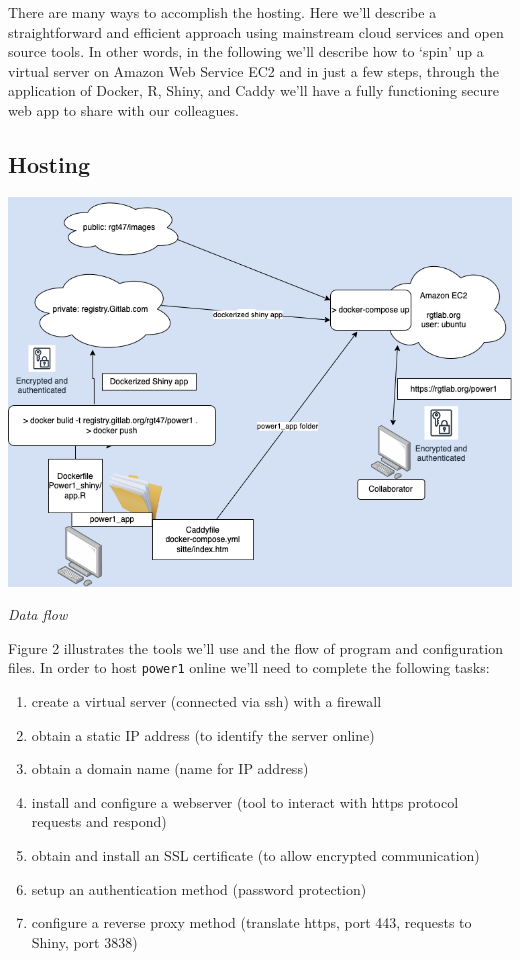 \documentclass[
  letterpaper,
  DIV=11,
  numbers=noendperiod,
  oneside]{scrartcl}
\providecommand{\tightlist}{%
  \setlength{\itemsep}{0pt}\setlength{\parskip}{0pt}}\usepackage{longtable,booktabs,array}
\begin{document}
There are many ways to accomplish the hosting. Here we'll describe a
straightforward and efficient approach using mainstream cloud services
and open source tools. In other words, in the following we'll describe
how to `spin' up a virtual server on Amazon Web Service EC2 and in just
a few steps, through the application of Docker, R, Shiny, and Caddy
we'll have a fully functioning secure web app to share with our
colleagues.

\hypertarget{hosting}{%
\subsection{Hosting}\label{hosting}}

\begin{marginfigure}

{\centering \includegraphics{img/compose_flow.png}

}

\caption{\emph{Data flow }}

\end{marginfigure}

Figure 2 illustrates the tools we'll use and the flow of program and
configuration files. In order to host \texttt{power1} online we'll need
to complete the following tasks:

\begin{enumerate}
\def\labelenumi{\arabic{enumi}.}
\tightlist
\item
  create a virtual server (connected via ssh) with a firewall
\item
  obtain a static IP address (to identify the server online)
\item
  obtain a domain name (name for IP address)
\item
  install and configure a webserver (tool to interact with https
  protocol requests and respond)
\item
  obtain and install an SSL certificate (to allow encrypted
  communication)
\item
  setup an authentication method (password protection)
\item
  configure a reverse proxy method (translate https, port 443, requests
  to Shiny, port 3838)
\end{enumerate}
\end{document}
